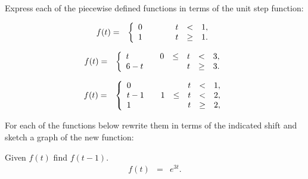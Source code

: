 \begin{problem}
\item Express each of the piecewise defined functions in terms of the
  unit step function:
  \begin{subproblem}
  \item 
    \begin{eqnarray}
      f(t) & = & \left\{
        \begin{array}{l@{\hspace{2em}}rcccl}
          0 &    &  & t & < & 1, \\
          1 &    &  & t & \geq & 1. \\
        \end{array}
      \right.
    \end{eqnarray}
    \vfill

  \item 
    \begin{eqnarray}
      f(t) & = & \left\{
        \begin{array}{l@{\hspace{2em}}rcccl}
          t & 0 & \leq & t & < & 3, \\
          6-t &  &     & t & \geq & 3. \\
        \end{array}
      \right.
    \end{eqnarray}
    \vfill

  \item 
    \begin{eqnarray}
      f(t) & = & \left\{
        \begin{array}{l@{\hspace{2em}}rcccl}
          0   &    &  & t & < & 1, \\
          t-1 &  1 & \leq & t & < & 2, \\
          1   &    &      & t & \geq & 2, \\
        \end{array}
      \right.
    \end{eqnarray}
    \vfill

  \end{subproblem}


  \clearpage

\item For each of the functions below rewrite them in terms of the
  indicated shift and sketch a graph of the new function:

  \begin{subproblem}
  \item Given $f(t)$ find $f(t-1)$.
    \begin{eqnarray}
      f(t) & = & e^{3t}.
    \end{eqnarray}
    \vfill


\end{subproblem}
\end{problem}
